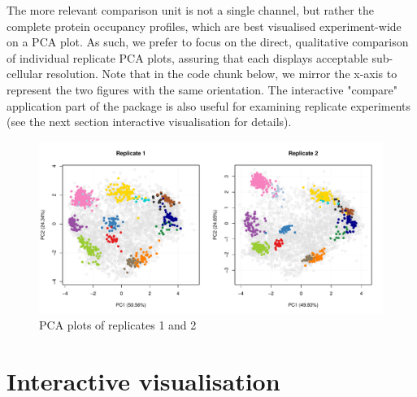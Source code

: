 The more relevant comparison unit is not a single channel, but rather
the complete protein occupancy profiles, which are best visualised 
experiment-wide on a PCA plot. As such, we prefer to focus on the
direct, qualitative comparison of individual replicate PCA plots,
assuring that each displays acceptable sub-cellular resolution. Note
that in the code chunk below, we mirror the x-axis to represent the
two figures with the same orientation. The interactive "compare"
application part of the  package is also useful for
examining replicate experiments (see the next section interactive
visualisation for details).

\begin{figure}[!ht]
  \centering
\begin{knitrout}
\color{fgcolor}\begin{kframe}
\begin{alltt}
\hlstd{(} \hlstd{=} \hlstd{(}\hlstd{,} \hlstd{))}
\hlstd{(hl[, hl}\hlopt{$} \hlopt{==} \hlstd{],}  \hlstd{=} \hlstd{)}
\hlstd{(hl[, hl}\hlopt{$} \hlopt{==} \hlstd{],}  \hlstd{=} \hlstd{,}  \hlstd{=} \hlstd{)}
\end{alltt}
\end{kframe}
\includegraphics[width=\textwidth]{figure/plot2Drep-1} 

\end{knitrout}
  \caption{PCA plots of replicates 1 and 2}
  \label{fig:plot2Drep}
\end{figure}


\clearpage

\section*{Interactive visualisation}


